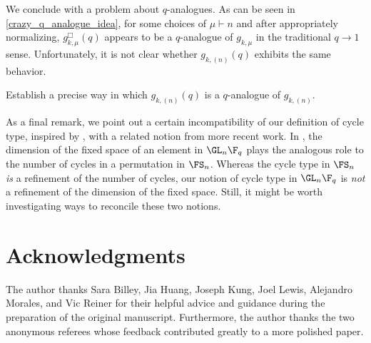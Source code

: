 We conclude with a problem about \(q\)-analogues.
As can be seen in \eqref{crazy_q_analogue_idea}, for some choices of \(\mu \vdash n\) and after appropriately normalizing, \(g_{k,\mu}^\Box (q)\) appears to be a \(q\)-analogue of \(g_{k,\mu}\) in the traditional \(q \to 1\) sense.
Unfortunately, it is not clear whether \(g_{k,(n)} (q)\) exhibits the same behavior.

\begin{problem}
Establish a precise way in which \(g_{k,(n)} (q)\) is a \(q\)-analogue of \(g_{k,(n)}\).
\end{problem}



As a final remark, we point out a certain incompatibility of our definition of cycle type, inspired by \cite{kung,stong}, with a related notion from more recent work.
In \cite{HLR,LM,refl_fact}, the dimension of the fixed space of an element in \(\GL_n \F_q\) plays the analogous role to the number of cycles in a permutation in \(\FS_n\).
Whereas the cycle type in \(\FS_n\) \emph{is} a refinement of the number of cycles, our notion of cycle type in \(\GL_n \F_q\) is \emph{not} a refinement of the dimension of the fixed space.
Still, it might be worth investigating ways to reconcile these two notions.








\section*{Acknowledgments}

The author thanks
Sara Billey,
Jia Huang,
Joseph Kung,
Joel Lewis,
Alejandro Morales, and
Vic Reiner
for their helpful advice and guidance during the preparation of the original manuscript.
Furthermore, the author thanks the two anonymous referees whose feedback contributed greatly to a more polished paper.







